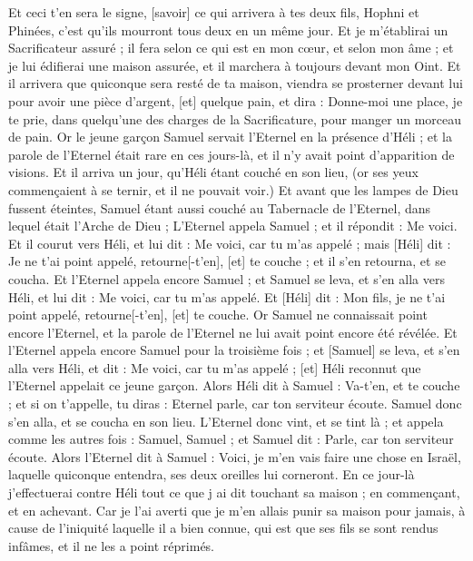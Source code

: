 \begin{multicols}{2}
Et ceci t'en sera le signe, [savoir] ce qui arrivera à tes deux fils, Hophni et Phinées, c'est qu'ils mourront tous deux en un même jour.
Et je m'établirai un Sacrificateur assuré ; il fera selon ce qui est en mon cœur, et selon mon âme ; et je lui édifierai une maison assurée, et il marchera à toujours devant mon Oint.
Et il arrivera que quiconque sera resté de ta maison, viendra se prosterner devant lui pour avoir une pièce d'argent, [et] quelque pain, et dira : Donne-moi une place, je te prie, dans quelqu'une des charges de la Sacrificature, pour manger un morceau de pain.
\VerseOne{}Or le jeune garçon Samuel servait l'Eternel en la présence d'Héli ; et la parole de l'Eternel était rare en ces jours-là, et il n'y avait point d'apparition de visions.
Et il arriva un jour, qu'Héli étant couché en son lieu, (or ses yeux commençaient à se ternir, et il ne pouvait voir.)
Et avant que les lampes de Dieu fussent éteintes, Samuel étant aussi couché au Tabernacle de l'Eternel, dans lequel était l'Arche de Dieu ;
L'Eternel appela Samuel ; et il répondit : Me voici.
Et il courut vers Héli, et lui dit : Me voici, car tu m'as appelé ; mais [Héli] dit : Je ne t'ai point appelé, retourne[-t'en], [et] te couche ; et il s'en retourna, et se coucha.
Et l'Eternel appela encore Samuel ; et Samuel se leva, et s'en alla vers Héli, et lui dit : Me voici, car tu m'as appelé. Et [Héli] dit : Mon fils, je ne t'ai point appelé, retourne[-t'en], [et] te couche.
Or Samuel ne connaissait point encore l'Eternel, et la parole de l'Eternel ne lui avait point encore été révélée.
Et l'Eternel appela encore Samuel pour la troisième fois ; et [Samuel] se leva, et s'en alla vers Héli, et dit : Me voici, car tu m'as appelé ; [et] Héli reconnut que l'Eternel appelait ce jeune garçon.
Alors Héli dit à Samuel : Va-t'en, et te couche ; et si on t'appelle, tu diras : Eternel parle, car ton serviteur écoute. Samuel donc s'en alla, et se coucha en son lieu.
L'Eternel donc vint, et se tint là ; et appela comme les autres fois : Samuel, Samuel ; et Samuel dit : Parle, car ton serviteur écoute.
Alors l'Eternel dit à Samuel : Voici, je m'en vais faire une chose en Israël, laquelle quiconque entendra, ses deux oreilles lui corneront.
En ce jour-là j'effectuerai contre Héli tout ce que j ai dit touchant sa maison ; en commençant, et en achevant.
Car je l'ai averti que je m'en allais punir sa maison pour jamais, à cause de l'iniquité laquelle il a bien connue, qui est que ses fils se sont rendus infâmes, et il ne les a point réprimés.

\end{multicols}
